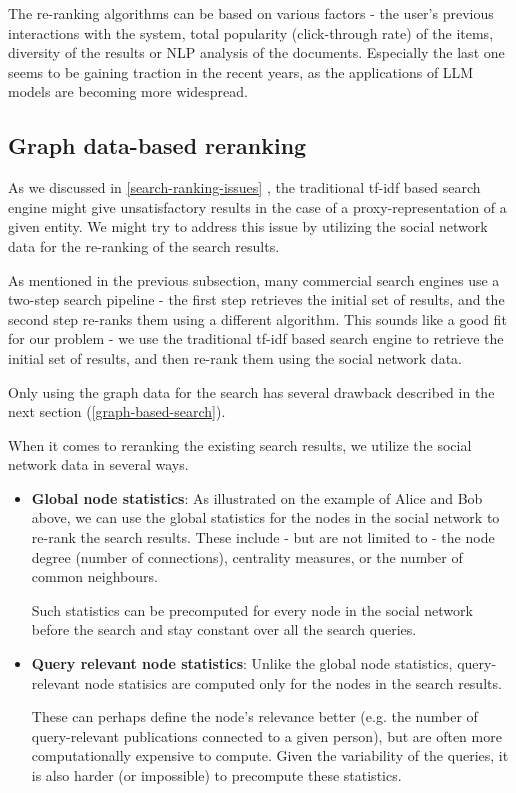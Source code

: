 The re-ranking algorithms can be based on various factors - the user's previous interactions with the system, total popularity (click-through rate) of the items,
diversity of the results %
or NLP analysis of the documents. Especially the last one seems to be gaining traction in the recent years, as the applications of LLM models are becoming more widespread.

\subsection{Graph data-based reranking}\label{graph-based-reranking}

As we discussed in \ref{search-ranking-issues}
, the traditional tf-idf based search engine might give unsatisfactory results in the case 
of a proxy-representation of a given entity.
We might try to address this issue by utilizing the social network data for the re-ranking of the search results.

As mentioned in the previous subsection, many commercial search engines use a two-step search pipeline - the first step retrieves the initial set of results,
and the second step re-ranks them using a different algorithm. This sounds like a good fit for our problem - we use the traditional tf-idf based search engine 
to retrieve the initial set of results, and then re-rank them using the social network data. 

Only using the graph data for the search has several drawback described in the next section (\ref{graph-based-search}).

When it comes to reranking the existing search results, we utilize the social network data in several ways.

\begin{itemize}
    \item \textbf{Global node statistics}: As illustrated on the example of Alice and Bob above, 
    we can use the global statistics for the nodes in the social network to re-rank the search results. 
    These include - but are not limited to - the node degree (number of connections), centrality measures, or the number of common neighbours.

    Such statistics can be precomputed for every node in the social network before the search and stay constant over all the search queries.

    \item \textbf{Query relevant node statistics}: Unlike the global node statistics, query-relevant node statisics are computed only for the nodes in the search results.
    
    These can perhaps define the node's relevance better (e.g. the number of query-relevant publications connected to a given person), but are often more computationally expensive to compute.
    Given the variability of the queries, it is also harder (or impossible) to precompute these statistics.
\end{itemize}

